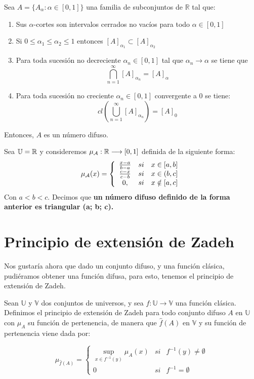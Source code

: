 \begin{teorema}
	Sea $A=\{A_\alpha : \alpha \in [0, 1]\}$ una familia de subconjuntos de $\mathbb{R}$ tal que:
	
	\begin{enumerate}
		\item Sus $\alpha$-cortes son intervalos cerrados no vacíos para todo $\alpha \in [0, 1]$
		\item Si $0 \leq \alpha_1 \leq \alpha_2 \leq 1$ entonces $[A]_{\alpha_1} \subset [A]_{\alpha_2}$
		\item Para toda sucesión no decreciente $\alpha_n \in [0, 1]$ tal que $\alpha_n \longrightarrow \alpha$ se tiene que
		$$
		\bigcap^\infty_{n=1} [A]_{\alpha_n}=[A]_\alpha
		$$
		\item Para toda sucesión no creciente $\alpha_n \in [0, 1]$ convergente a $0$ se tiene:
		$$
		cl\left(\bigcup^\infty_{n=1} [A]_{\alpha_n}\right)=[A]_0
		$$
	\end{enumerate}
	Entonces, $A$ es un número difuso.
\end{teorema}


\begin{ejemplo}
	Sea $\mathbb U=\mathbb R$ y consideremos $\mu_\mathcal{A}: \mathbb R \longrightarrow [0, 1]$ definida de la siguiente forma:
	$$
	\mu_\mathcal{A}(x)=\left\{
	\begin{array}{c c c}
	\frac{x-a}{b-a} & si & x \in [a, b] \\
	\frac{c-x}{c-b} & si & x \in (b, c] \\
	0, & si & x \notin [a, c]
	\end{array}
	\right.
	$$
	Con $a < b < c$. Decimos que \textbf{un número difuso definido de la forma anterior es triangular (a; b; c).} 
	
\end{ejemplo}


\section{Principio de extensión de Zadeh}
Nos gustaría ahora que dado un conjunto difuso, y una función clásica, pudiéramos obtener una función difusa, para esto, tenemos el principio de extensión de Zadeh.

\begin{definicion}
	Sean $\mathbb{U}$ y $\mathbb{V}$ dos conjuntos de universos, y sea $f: \mathbb{U} \longrightarrow \mathbb{V}$ una función clásica. Definimos el principio de extensión de Zadeh para todo conjunto difuso $A$ en $\mathbb{U}$ con $\mu_A$ su función de pertenencia, de manera que $\hat{f}(A)$ en $\mathbb{V}$ y su función de pertenencia viene dada por:
	
	$$
		\mu_{\hat{f}(A)}=\left\{
			\begin{array}{ccc}
				\sup_{x\in f^{-1}(y)} \mu_A(x) & si & f^{-1}(y)\neq\emptyset\\
				0 & si & f^{-1}=\emptyset
			\end{array}
		\right.
	$$
\end{definicion}


